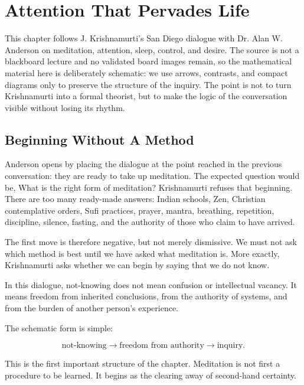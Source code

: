 \chapter{Attention That Pervades Life}

This chapter follows J. Krishnamurti's San Diego dialogue with Dr. Alan W. Anderson on meditation, attention, sleep, control, and desire. The source is not a blackboard lecture and no validated board images remain, so the mathematical material here is deliberately schematic: we use arrows, contrasts, and compact diagrams only to preserve the structure of the inquiry. The point is not to turn Krishnamurti into a formal theorist, but to make the logic of the conversation visible without losing its rhythm.

\section{Beginning Without A Method}

Anderson opens by placing the dialogue at the point reached in the previous conversation: they are ready to take up meditation. The expected question would be, What is the right form of meditation? Krishnamurti refuses that beginning. There are too many ready-made answers: Indian schools, Zen, Christian contemplative orders, Sufi practices, prayer, mantra, breathing, repetition, discipline, silence, fasting, and the authority of those who claim to have arrived.

The first move is therefore negative, but not merely dismissive. We must not ask which method is best until we have asked what meditation is. More exactly, Krishnamurti asks whether we can begin by saying that we do not know.

\begin{definition}
In this dialogue, not-knowing does not mean confusion or intellectual vacancy. It means freedom from inherited conclusions, from the authority of systems, and from the burden of another person's experience.
\end{definition}

The schematic form is simple:

\begin{equation}
\text{not-knowing}
\longrightarrow
\text{freedom from authority}
\longrightarrow
\text{inquiry}.
\end{equation}

This is the first important structure of the chapter. Meditation is not first a procedure to be learned. It begins as the clearing away of second-hand certainty.

